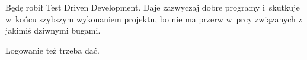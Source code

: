Będę robił Test Driven Development. Daje zazwyczaj dobre programy i~skutkuje w~końcu szybszym wykonaniem projektu, bo nie ma przerw w~prcy związanych z jakimiś dziwnymi bugami.

Logowanie też trzeba dać.

%
%
%
%
%
